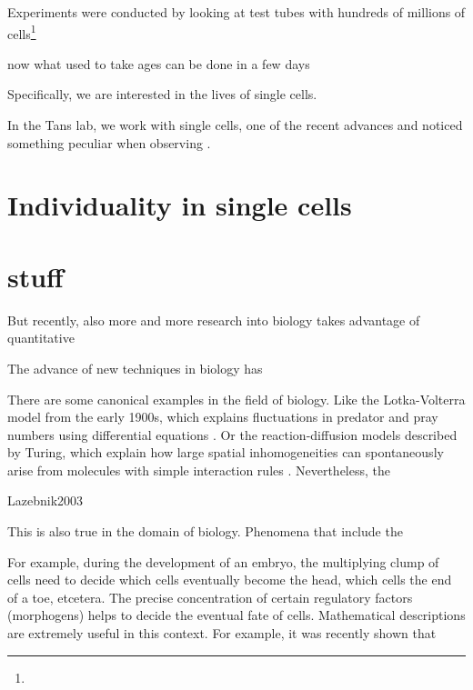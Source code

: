 Experiments were conducted by looking at test tubes with hundreds of millions of cells\footnote{} 

now
what used to take ages
can be done in a few days


Specifically, we are interested in the lives of single cells.
%

%
%


In the Tans lab, we work with single cells, one of the recent advances 
%
and noticed something peculiar when observing .

\section{Individuality in single cells}



\section*{stuff}
But recently, also more and more research into biology takes advantage of quantitative 


The advance of new techniques in biology has 


There are some canonical examples in the field of biology.
%
Like the Lotka-Volterra model from the early 1900s, which explains fluctuations in predator and pray numbers using differential equations \cite{Lotka1920,Volterra1928}.
Or the reaction-diffusion models described by Turing, which explain how large spatial inhomogeneities can spontaneously arise from molecules with simple interaction rules \cite{Turing1952}.
%
Nevertheless, the 

Lazebnik2003


This is also true in the domain of biology.
%
Phenomena that include the 


For example, during the development of an embryo, the multiplying clump of cells need to decide which cells eventually become the head, which cells the end of a toe, etcetera.
%
The precise concentration of certain regulatory factors (morphogens) helps to decide the eventual fate of cells.
%
Mathematical descriptions are extremely useful in this context.
%
For example, it was recently shown that 





